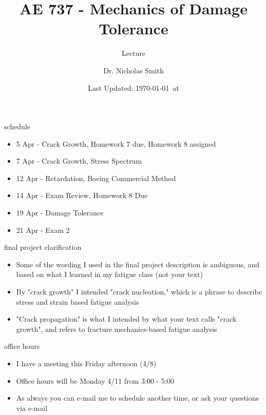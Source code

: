 \documentclass[10pt]{beamer}
\title{AE 737 - Mechanics of Damage Tolerance}
\subtitle{Lecture \arabic{lecture}}
\date{Last Updated: \today\ at \DTMcurrenttime}
\author{Dr. Nicholas Smith}
\institute{Wichita State University, Department of Aerospace Engineering}
\begin{document}
\maketitle
\begin{frame}{schedule}
	\begin{itemize}
		\item 5 Apr - Crack Growth, Homework 7 due, Homework 8 assigned
		\item 7 Apr - Crack Growth, Stress Spectrum
		\item 12 Apr - Retardation, Boeing Commercial Method
		\item 14 Apr - Exam Review, Homework 8 Due
		\item 19 Apr - Damage Tolerance
		\item 21 Apr - Exam 2
	\end{itemize}
\end{frame}

\begin{frame}{final project clarification}
	\begin{itemize}[<+->]
		\item Some of the wording I used in the final project description is ambiguous, and based on what I learned in my fatigue class (not your text)
		\item By "crack growth" I intended "crack nucleation," which is a phrase to describe stress and strain based fatigue analysis
		\item "Crack propagation" is what I intended by what your text calls "crack growth", and refers to fracture mechanics-based fatigue analysis
	\end{itemize}
\end{frame}

\begin{frame}{office hours}
	\begin{itemize}
		\item I have a meeting this Friday afternoon (4/8)
		\item Office hours will be Monday 4/11 from 3:00 - 5:00
		\item As always you can e-mail me to schedule another time, or ask your questions via e-mail
	\end{itemize}
\end{frame}
\end{document}
